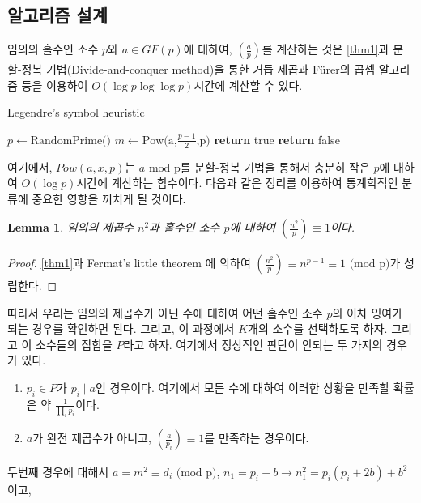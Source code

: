 \documentclass[a4paper]{article}
\newcommand{\Leg}[3][]{\left(\frac{#2}{#3}\right)_{#1}}
\newtheorem{lemma}{Lemma}
\begin{document}
    \subsection{알고리즘 설계}
        임의의 홀수인 소수 $p$와 $a \in GF(p)$에 대하여, $\Leg{a}{p}$를 계산하는 것은 \ref{thm1}과 분할-정복 기법(Divide-and-conquer method)을 통한 거듭 제곱과 Fürer의 곱셈 알고리즘 등을 이용하여 $O(\log{p}\log{\log{p}})$시간에 계산할 수 있다.
        \begin{algorithm}
            \caption{Legendre's symbol heuristic}\label{algo1}
            \begin{algorithmic}
                \State $p \gets \text{RandomPrime()}$
                \State $m \gets \text{Pow(a,$\frac{p-1}{2}$,p)}$
                    \State \textbf{return} true
                \Else
                    \State \textbf{return} false
                \EndIf
            \end{algorithmic}
        \end{algorithm}
        여기에서, $Pow(a,x,p)$는 $a \text{ mod p}$를 분할-정복 기법을 통해서 충분히 작은 $p$에 대하여 $O(\log{p})$시간에 계산하는 함수이다.
        다음과 같은 정리를 이용하여 통계학적인 분류에 중요한 영향을 끼치게 될 것이다.
        \begin{lemma}
            임의의 제곱수 $n^{2}$과 홀수인 소수 $p$에 대하여 $\Leg{n^{2}}{p} \equiv 1$이다.
        \end{lemma}
        \begin{proof}
            \ref{thm1}과 Fermat's little theorem \cite{hardy_heath-brown_wright_2011}에 의하여 $\Leg{n^{2}}{p}\equiv n^{p-1} \equiv 1 \text{ (mod p)}$가 성립한다.
        \end{proof}
        따라서 우리는 임의의 제곱수가 아닌 수에 대하여 어떤 홀수인 소수 $p$의 이차 잉여가 되는 경우를 확인하면 된다.
        그리고, 이 과정에서 $K$개의 소수를 선택하도록 하자.
        그리고 이 소수들의 집합을 $P$라고 하자.
        여기에서 정상적인 판단이 안되는 두 가지의 경우가 있다.
        \begin{enumerate}
            \item $p_{i} \in P$가 $p_{i} \mid a$인 경우이다. 여기에서 모든 수에 대하여 이러한 상황을 만족할 확률은 약 $\frac{1}{\prod\nolimits_{i} p_{i}}$이다.
            \item $a$가 완전 제곱수가 아니고, $\Leg{a}{p_{i}} \equiv 1$를 만족하는 경우이다.
        \end{enumerate}
        두번째 경우에 대해서 $a = m^{2} \equiv d_{i} \text{ (mod p)}$, $n_{1} = p_{i} + b \rightarrow n_{1}^{2}=p_{i}(p_{i} + 2b) + b^{2}$이고,
\end{document}
